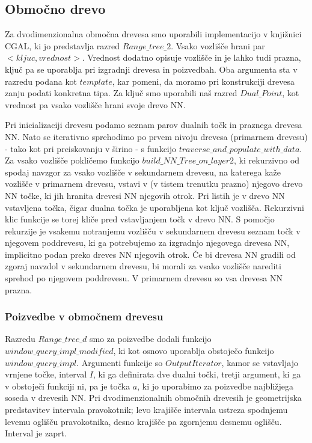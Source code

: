 \documentclass[a4paper, 12pt]{book}
\begin{document}
\subsection{Območno drevo}
Za dvodimenzionalna območna drevesa smo uporabili implementacijo v knjižnici CGAL, ki jo predstavlja razred $Range\texttt{\_}tree\texttt{\_}2$. Vsako vozlišče hrani par $<kljuc, vrednost>$. Vrednost dodatno opisuje vozlišče in je lahko tudi prazna, ključ pa se uporablja pri izgradnji drevesa in poizvedbah. Oba argumenta sta v razredu podana kot $template$, kar pomeni, da moramo pri konstrukciji drevesa zanju podati konkretna tipa. 
Za ključ smo uporabili naš razred $Dual\texttt{\_}Point$, kot vrednost pa vsako vozlišče hrani svoje drevo NN.

Pri inicializaciji drevesu podamo seznam parov dualnih točk in praznega drevesa NN. Nato se iterativno sprehodimo po prvem nivoju drevesa (primarnem drevesu) - tako kot pri preiskovanju v širino - s funkcijo $traverse\texttt{\_}and\texttt{\_}populate\texttt{\_}with\texttt{\_}data$. Za vsako vozlišče pokličemo funkcijo $build\texttt{\_}NN\texttt{\_}Tree\texttt{\_}on\texttt{\_}layer2$, ki rekurzivno  od spodaj navzgor za vsako vozlišče v sekundarnem drevesu, na katerega kaže vozlišče v primarnem drevesu, vstavi v (v tistem trenutku prazno) njegovo drevo NN točke, ki jih hranita drevesi NN njegovih otrok. Pri listih je v drevo NN vstavljena točka, čigar dualna točka je uporabljena kot ključ vozlišča. Rekurzivni klic funkcije se torej kliče pred vstavljanjem točk v drevo NN. S pomočjo rekurzije je vsakemu notranjemu vozlišču v sekundarnem drevesu seznam točk v njegovem poddrevesu, ki ga potrebujemo za izgradnjo njegovega drevesa NN, implicitno podan preko dreves NN njegovih otrok. Če bi drevesa NN gradili od zgoraj navzdol v sekundarnem drevesu, bi morali za vsako vozlišče narediti sprehod po njegovem poddrevesu. V primarnem drevesu so vsa drevesa NN prazna.

\subsubsection{Poizvedbe v območnem drevesu}
Razredu $Range\texttt{\_}tree\texttt{\_}d$ smo za poizvedbe dodali funkcijo $window\texttt{\_}query\texttt{\_}impl\texttt{\_}modified$, ki  kot osnovo uporablja obstoječo funkcijo $window\texttt{\_}query\texttt{\_}impl$. Argumenti funkcije so $OutputIterator$, kamor se vstavljajo vrnjene točke, interval $I$, ki ga definirata dve dualni točki, tretji argument, ki ga v obstoječi funkciji ni, pa je točka $a$, ki jo uporabimo za poizvedbe najbližjega soseda v drevesih NN. Pri dvodimenzionalnih območnih drevesih je geometrijska predstavitev intervala pravokotnik; levo krajišče intervala ustreza spodnjemu levemu oglišču pravokotnika, desno krajišče pa zgornjemu desnemu oglišču. Interval je zaprt. 
\end{document}
